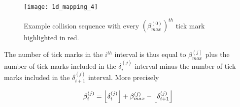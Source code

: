 \begin{figure}[H]
  \begin{center}
    \texttt{[image: 1d\_mapping\_4]}
  \end{center}
  \vspace{-.2in} %
  \caption{\label{fig:a-sequence} Example collision sequence with every $(\beta^{(0)}_{max})^{th}$ tick mark highlighted in red.}
\end{figure}

The number of tick marks in the $i^{th}$ interval is thus equal to $\beta^{(j)}_{max}$ plus the number of tick marks included in the $\delta^{(j)}_i$ interval minus the number of tick marks included in the $\delta^{(j)}_{i+1}$ interval. More precisely

\begin{align}\label{eq:beta_i}
  \beta^{(j)}_i = \floor{\delta^{(j)}_i} + \beta^{(j)}_{max} - \floor{\delta^{(j)}_{i+1}}
\end{align}